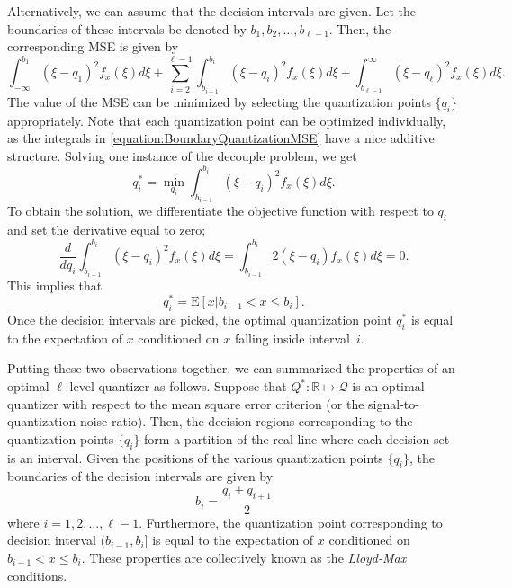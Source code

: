 Alternatively, we can assume that the decision intervals are given.
Let the boundaries of these intervals be denoted by $b_1, b_2, \ldots, b_{\ell-1}$.
Then, the corresponding MSE is given by
\begin{equation} \label{equation:BoundaryQuantizationMSE}
\int_{-\infty}^{b_1} (\xi - q_1)^2 f_x(\xi) d\xi
+ \sum_{i=2}^{{\ell}-1}
\int_{b_{i-1}}^{b_i} (\xi - q_i)^2 f_x(\xi) d\xi
+ \int_{b_{\ell-1}}^{\infty} (\xi - q_{\ell})^2 f_x(\xi) d\xi .
\end{equation}
The value of the MSE can be minimized by selecting the quantization points $\{ q_i \}$ appropriately.
Note that each quantization point can be optimized individually, as the integrals in \eqref{equation:BoundaryQuantizationMSE} have a nice additive structure.
Solving one instance of the decouple problem, we get
\begin{equation*}
q_i^* = \min_{q_i} \int_{b_{i-1}}^{b_i} (\xi - q_i)^2 f_x(\xi) d\xi .
\end{equation*}
To obtain the solution, we differentiate the objective function with respect to $q_i$ and set the derivative equal to zero;
\begin{equation*}
\frac{d}{d q_i} \int_{b_{i-1}}^{b_i} (\xi - q_i)^2 f_x(\xi) d\xi
= \int_{b_{i-1}}^{b_i} 2 (\xi - q_i) f_x(\xi) d\xi = 0 .
\end{equation*}
This implies that
\begin{equation*}
q_i^* = \mathrm{E} [ x | b_{i-1} < x \leq b_i ] .
\end{equation*}
Once the decision intervals are picked, the optimal quantization point $q_i^*$ is equal to the expectation of $x$ conditioned on $x$ falling inside interval~$i$.

Putting these two observations together, we can summarized the properties of an optimal $\ell$-level quantizer as follows.
Suppose that $Q^* : \mathbb{R} \mapsto \mathcal{Q}$ is an optimal quantizer with respect to the mean square error criterion (or the signal-to-quantization-noise ratio).
Then, the decision regions corresponding to the quantization points $\{ q_i \}$ form a partition of the real line where each decision set is an interval.
Given the positions of the various quantization points $\{ q_i \}$, the boundaries of the decision intervals are given by
\begin{equation*}
b_i = \frac{q_i + q_{i+1}}{2}
\end{equation*}
where $i = 1, 2, \ldots, \ell-1$.
Furthermore, the quantization point corresponding to decision interval $(b_{i-1}, b_i]$ is equal to the expectation of $x$ conditioned on $b_{i-1} < x \leq b_i$.
These properties are collectively known as the \emph{Lloyd-Max} conditions.


